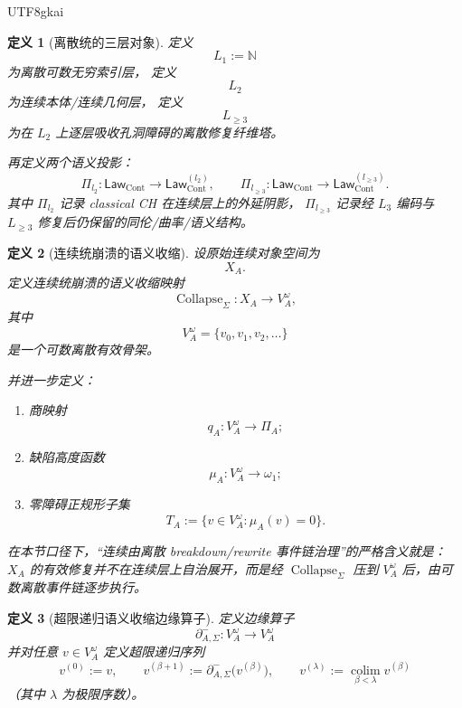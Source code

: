 \documentclass[12pt]{article}
\newtheorem{definition}{定义}[section]
\newcommand{\NN}{\mathbb{N}}
\newcommand{\Collapse}{\operatorname{Collapse}}
\begin{document}
\begin{CJK*}{UTF8}{gkai}
\begin{definition}[离散统的三层对象]
\label{def:tex1-ch10-layers}
定义
\[
  L_1:=\NN
\]
为离散可数无穷索引层，
定义
\[
  L_2
\]
为连续本体/连续几何层，
定义
\[
  L_{\ge 3}
\]
为在 \(L_2\) 上逐层吸收孔洞障碍的离散修复纤维塔。

再定义两个语义投影：
\[
  \Pi_{l_2}:\mathsf{Law}_{\mathrm{Cont}}\to \mathsf{Law}_{\mathrm{Cont}}^{(l_2)},
  \qquad
  \Pi_{l_{\ge 3}}:\mathsf{Law}_{\mathrm{Cont}}\to \mathsf{Law}_{\mathrm{Cont}}^{(l_{\ge 3})}.
\]
其中 \(\Pi_{l_2}\) 记录 classical CH 在连续层上的外延阴影，
\(\Pi_{l_{\ge 3}}\) 记录经 \(L_3\) 编码与 \(L_{\ge 3}\) 修复后仍保留的同伦/曲率/语义结构。
\end{definition}

\begin{definition}[连续统崩溃的语义收缩]
\label{def:tex1-ch10-collapse}
设原始连续对象空间为
\[
  X_A.
\]
定义连续统崩溃的语义收缩映射
\[
  \Collapse_{\Sigma}:X_A\to V_A^\omega,
\]
其中
\[
  V_A^\omega=\{v_0,v_1,v_2,\dots\}
\]
是一个可数离散有效骨架。

并进一步定义：
\begin{enumerate}
  \item 商映射
  \[
    q_A:V_A^\omega\to \Pi_A;
  \]
  \item 缺陷高度函数
  \[
    \mu_A:V_A^\omega\to \omega_1;
  \]
  \item 零障碍正规形子集
  \[
    T_A:=\{v\in V_A^\omega:\mu_A(v)=0\}.
  \]
\end{enumerate}
在本节口径下，“连续由离散 breakdown/rewrite 事件链治理”的严格含义就是：
\(X_A\) 的有效修复并不在连续层上自治展开，而是经 \(\Collapse_{\Sigma}\) 压到
\(V_A^\omega\) 后，由可数离散事件链逐步执行。
\end{definition}

\begin{definition}[超限递归语义收缩边缘算子]
\label{def:tex1-ch10-operator}
定义边缘算子
\[
  \partial^-_{A,\Sigma}:V_A^\omega\to V_A^\omega
\]
并对任意 \(v\in V_A^\omega\) 定义超限递归序列
\[
  v^{(0)}:=v,
  \qquad
  v^{(\beta+1)}:=\partial^-_{A,\Sigma}\bigl(v^{(\beta)}\bigr),
  \qquad
  v^{(\lambda)}:=\operatorname*{colim}_{\beta<\lambda}v^{(\beta)}
\]
（其中 \(\lambda\) 为极限序数）。


\end{definition}
\end{CJK*}
\end{document}
